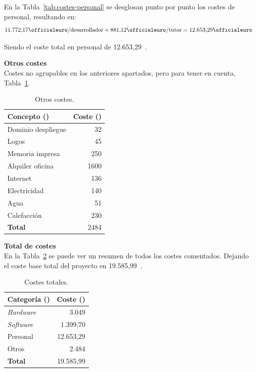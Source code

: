 En la Tabla~\ref{tab:costes-personal} se desglosan punto por punto los costes de personal, resultando en:
\[ \text{11.772,17\officialeuro/desarrollador} + \text{881,12\officialeuro/tutor} =  \text{12.653,29\officialeuro}\]

Siendo el coste total en personal de  12.653,29~\officialeuro{}.

\textbf{Otros costes}\\
Costes no agrupables en los anteriores apartados, pero para tener en cuenta, Tabla~\ref{tab:costes-otros}.

\begin{table}[H]
\centering
\begin{tabular}{lr}
	\toprule
	\textbf{Concepto (\officialeuro)} & \textbf{Coste (\officialeuro)} \\
	\midrule
	Dominio despliegue & 32 \\
	Logos & 45 \\
	Memoria impresa & 250 \\
	Alquiler oficina & 1600 \\
	Internet & 136\\
	Electricidad & 140 \\
	Agua & 51\\
	Calefacción & 230 \\
	\midrule
	\textbf{Total} & 2484 \\
	\bottomrule
\end{tabular}
\caption{Otros costes.}\label{tab:costes-otros}
\end{table}

\textbf{Total de  costes}\\
En la Tabla~\ref{tab:costes-totales} se puede ver un resumen de todos los costes comentados. Dejando el coste base total del proyecto en 19.585,99~\officialeuro.

\begin{table}[H]
\centering
\begin{tabular}{lr}
	\toprule
	\textbf{Categoría (\officialeuro)} & \textbf{Coste (\officialeuro)} \\
	\midrule
	\textit{Hardware} & 3.049 \\
	\textit{Software} & 1.399,70 \\
	Personal & 12.653,29 \\
	Otros & 2.484 \\
	\midrule
	\textbf{Total} & 19.585,99 \\
	\bottomrule
\end{tabular}
\caption{Costes totales.}\label{tab:costes-totales}
\end{table}


